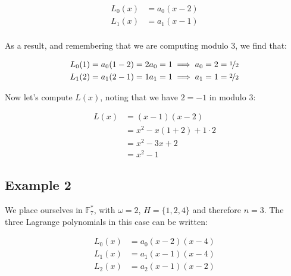 \documentclass[a4paper]{article}
\begin{document}
\begin{equation}
  \begin{aligned}
    L_0(x) &= a_0(x - 2) \\
    L_1(x) &= a_1(x - 1) \\
  \end{aligned}
\end{equation}

As a result, and remembering that we are computing modulo $3$, we find that:

\begin{equation}
  \begin{aligned}
    L_0(1) &= a_0(1 - 2) = 2a_0 = 1 \implies a_0 = 2 = \nicefrac{1}{2} \\
    L_1(2) &= a_1(2 - 1) = 1a_1 = 1 \implies a_1 = 1 = \nicefrac{2}{2} \\
  \end{aligned}
\end{equation}

Now let's compute $L(x)$, noting that we have $2 = -1$ in modulo 3:

\begin{equation}
  \begin{aligned}
    L(x) &= (x-1)(x-2) \\
         &= x^2 - x(1+2) + 1\cdot2 \\
         &= x^2 - 3x + 2 \\
         &= x^2 - 1
  \end{aligned}
\end{equation}


\subsection{Example 2}

We place ourselves in $\mathbb{F}_7^{*}$, with $\omega = 2$, $H = \{1, 2, 4\}$ and therefore $n = 3$. The three Lagrange polynomials in this case can be written:

\begin{equation}
  \begin{aligned}
    L_0(x) &= a_0(x - 2)(x-4) \\
    L_1(x) &= a_1(x - 1)(x-4)\\
    L_2(x) &= a_2(x - 1)(x-2)\\
  \end{aligned}
\end{equation}
\end{document}
